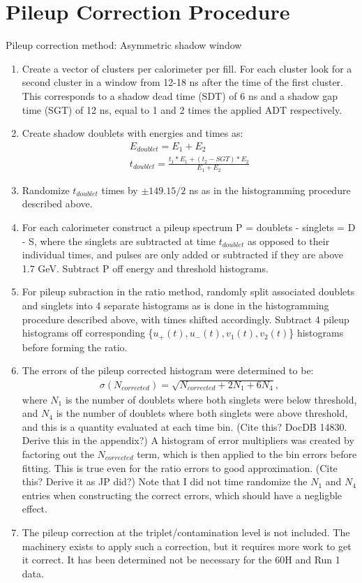 \section{Pileup Correction Procedure}

Pileup correction method: Asymmetric shadow window

\begin{enumerate}
	\item{Create a vector of clusters per calorimeter per fill. For each cluster look for a second cluster in a window from 12-18 ns after the time of the first cluster. This corresponds to a shadow dead time (SDT) of 6 ns and a shadow gap time (SGT) of 12 ns, equal to 1 and 2 times the applied ADT respectively.}
	\item{Create shadow doublets with energies and times as:
		\begin{gather}
			E_{doublet} = E_{1} + E_{2} \\
			t_{doublet} = \frac{t_{1}*E_{1} + (t_{2}-SGT)*E_{2}}{E_{1} + E_{2}}
		\end{gather}}
	\item{Randomize $t_{doublet}$ times by $\pm 149.15/2$ ns as in the histogramming procedure described above.}
	\item{For each calorimeter construct a pileup spectrum P = doublets - singlets = D - S, where the singlets are subtracted at time $t_{doublet}$ as opposed to their individual times, and pulses are only added or subtracted if they are above 1.7 GeV. Subtract P off energy and threshold histograms.}
	\item{For pileup subraction in the ratio method, randomly split associated doublets and singlets into 4 separate histograms as is done in the histogramming procedure described above, with times shifted accordingly. Subtract 4 pileup histograms off corresponding \{$u_{+}(t), u_{-}(t), v_{1}(t), v_{2}(t)$\} histograms before forming the ratio.}
	\item{The errors of the pileup corrected histogram were determined to be: 
		\begin{gather}
			\sigma(N_{corrected}) = \sqrt{N_{corrected} + 2 N_{1} + 6 N_{4}},
		\end{gather}
	where $N_{1}$ is the number of doublets where both singlets were below threshold, and $N_{4}$ is the number of doublets where both singlets were above threshold, and this is a quantity evaluated at each time bin. (Cite this? DocDB 14830. Derive this in the appendix?) A histogram of error multipliers was created by factoring out the $N_{corrected}$ term, which is then applied to the bin errors before fitting. This is true even for the ratio errors to good approximation. (Cite this? Derive it as JP did?) Note that I did not time randomize the $N_{1}$ and $N_{4}$ entries when constructing the correct errors, which should have a negligble effect.}
	\item{The pileup correction at the triplet/contamination level is not included. The machinery exists to apply such a correction, but it requires more work to get it correct. It has been determined not be necessary for the 60H and Run 1 data.}
\end{enumerate}


